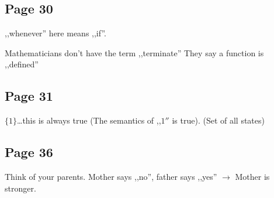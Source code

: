 \documentclass[a4paper]{article}
\begin{document}
\subsection{Page 30}
,,whenever'' here means ,,if''.

Mathematicians don't have the term ,,terminate'' They say  a function is
,,defined''

\subsection{Page 31}
$\{1\}$\ldots this is always true (The semantics of ,,$1''$ is true). (Set of
all states)

\subsection{Page 36}
Think of your parents. Mother says ,,no'', father says ,,yes'' $\rightarrow$
Mother is stronger.
\end{document}
